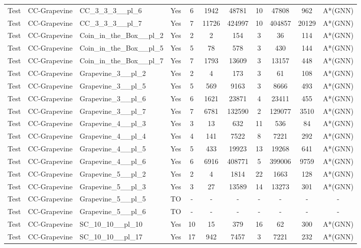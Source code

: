 \documentclass{article}
\begin{document}
\begin{tabular}{lllcccccccc}
Test & CC-Grapevine & CC\_3\_3\_3\_\_pl\_6 & Yes & 6 & 1942 & 48781 & 10 & 47808 & 962 & A*(GNN) \\
Test & CC-Grapevine & CC\_3\_3\_3\_\_pl\_7 & Yes & 7 & 11726 & 424997 & 10 & 404857 & 20129 & A*(GNN) \\
Test & CC-Grapevine & Coin\_in\_the\_Box\_\_pl\_2 & Yes & 2 & 2 & 154 & 3 & 36 & 114 & A*(GNN) \\
Test & CC-Grapevine & Coin\_in\_the\_Box\_\_pl\_5 & Yes & 5 & 78 & 578 & 3 & 430 & 144 & A*(GNN) \\
Test & CC-Grapevine & Coin\_in\_the\_Box\_\_pl\_7 & Yes & 7 & 1793 & 13609 & 3 & 13157 & 448 & A*(GNN) \\
Test & CC-Grapevine & Grapevine\_3\_\_pl\_2 & Yes & 2 & 4 & 173 & 3 & 61 & 108 & A*(GNN) \\
Test & CC-Grapevine & Grapevine\_3\_\_pl\_5 & Yes & 5 & 569 & 9163 & 3 & 8666 & 493 & A*(GNN) \\
Test & CC-Grapevine & Grapevine\_3\_\_pl\_6 & Yes & 6 & 1621 & 23871 & 4 & 23411 & 455 & A*(GNN) \\
Test & CC-Grapevine & Grapevine\_3\_\_pl\_7 & Yes & 7 & 6781 & 132590 & 2 & 129077 & 3510 & A*(GNN) \\
Test & CC-Grapevine & Grapevine\_4\_\_pl\_3 & Yes & 3 & 13 & 632 & 11 & 536 & 84 & A*(GNN) \\
Test & CC-Grapevine & Grapevine\_4\_\_pl\_4 & Yes & 4 & 141 & 7522 & 8 & 7221 & 292 & A*(GNN) \\
Test & CC-Grapevine & Grapevine\_4\_\_pl\_5 & Yes & 5 & 433 & 19923 & 13 & 19268 & 641 & A*(GNN) \\
Test & CC-Grapevine & Grapevine\_4\_\_pl\_6 & Yes & 6 & 6916 & 408771 & 5 & 399006 & 9759 & A*(GNN) \\
Test & CC-Grapevine & Grapevine\_5\_\_pl\_2 & Yes & 2 & 4 & 1814 & 22 & 1663 & 128 & A*(GNN) \\
Test & CC-Grapevine & Grapevine\_5\_\_pl\_3 & Yes & 3 & 27 & 13589 & 14 & 13273 & 301 & A*(GNN) \\
Test & CC-Grapevine & Grapevine\_5\_\_pl\_5 & TO & - & - & - & - & - & - & - \\
Test & CC-Grapevine & Grapevine\_5\_\_pl\_6 & TO & - & - & - & - & - & - & - \\
Test & CC-Grapevine & SC\_10\_10\_\_pl\_10 & Yes & 10 & 15 & 379 & 16 & 62 & 300 & A*(GNN) \\
Test & CC-Grapevine & SC\_10\_10\_\_pl\_17 & Yes & 17 & 942 & 7457 & 3 & 7221 & 232 & A*(GNN) \\

\end{tabular}
\end{document}
